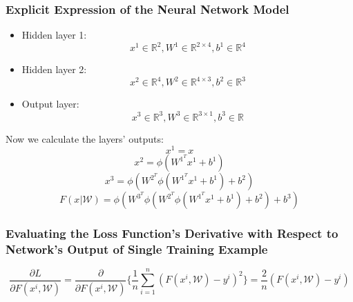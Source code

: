 \documentclass[12pt]{article}
\begin{document}
\subsubsection{Explicit Expression of the Neural Network Model}
\begin{itemize}
    \item Hidden layer 1:\\
$$x^1\in \mathbb{R}^{2}, W^1 \in \mathbb{R}^{2\times 4}, b^1\in \mathbb{R}^{4} $$
    \item Hidden layer 2:\\
$$x^2\in \mathbb{R}^{4}, W^2 \in \mathbb{R}^{4\times 3},  b^2\in \mathbb{R}^{3} $$
    \item Output layer:\\
$$x^3\in \mathbb{R}^{3}, W^3 \in \mathbb{R}^{3\times 1},  b^3\in \mathbb{R} $$
\end{itemize}
Now we calculate the layers' outputs:\\
$$x^1 = x$$
$$x^2 = \phi( W^{1^T} x^1 + b^1 )$$
$$x^3 = \phi( W^{2^T} \phi( W^{1^T} x^1 + b^1 ) + b^2)$$
$$F\left(x \vert \mathcal{W}\right) = \phi( W^{3^T} \phi( W^{2^T} \phi( W^{1^T} x^1 + b^1 ) + b^2) + b^3)$$
\subsubsection{Evaluating  the  Loss  Function’s  Derivative  with  Respect  to  Network’s Output of Single Training Example}
$$\frac{\partial L}{\partial F\left(x^i, \mathcal{W} \right)} = \frac{\partial }{\partial F\left(x^i, \mathcal{W} \right)}\{ \frac{1}{n}\sum_{i=1}^{n} (F(x^i , \mathcal{W}) - y^i )^2\} = \frac{2}{n} (F(x^i , \mathcal{W}) - y^i)$$
\end{document}
